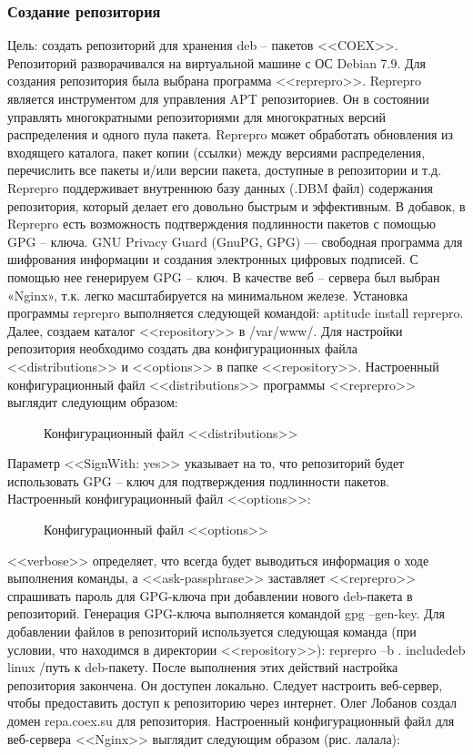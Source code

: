 \subsubsection{Создание репозитория}
Цель: создать репозиторий для хранения deb – пакетов <<COEX>>.
Репозиторий разворачивался на виртуальной машине с ОС Debian 7.9. Для создания репозитория была выбрана программа <<reprepro>>.
Reprepro является инструментом для управления APT репозиториев. Он в состоянии управлять многократными репозиториями для многократных версий распределения и одного пула пакета. Reprepro может обработать обновления из входящего каталога, пакет копии (ссылки) между версиями распределения, перечислить все пакеты и/или версии пакета, доступные в репозитории и т.д. 
Reprepro поддерживает внутреннюю базу данных (.DBM файл) содержания репозитория, который делает его довольно быстрым и эффективным.
В добавок, в Reprepro есть возможность подтверждения подлинности пакетов с помощью GPG – ключа.
GNU Privacy Guard (GnuPG, GPG) — свободная программа для шифрования информации и создания электронных цифровых подписей. С помощью нее генерируем GPG – ключ.
В качестве веб – сервера был выбран «Nginx», т.к. легко масштабируется на минимальном железе.
Установка программы reprepro выполняется следующей командой: aptitude install reprepro. Далее, создаем каталог <<repository>> в /var/www/. Для настройки репозитория необходимо создать два конфигурационных файла <<distributions>> и <<options>> в папке <<repository>>.
Настроенный конфигурационный файл <<distributions>> программы <<reprepro>> выглядит следующим образом:

\begin{figure}[h!]
\caption{ Конфигурационный файл <<distributions>> }
\label{kucher_4:kucher_4}
\end{figure}

Параметр <<SignWith: yes>> указывает на то, что репозиторий будет использовать GPG – ключ для подтверждения подлинности пакетов.
	Настроенный конфигурационный файл <<options>>:
	
\begin{figure}[h!]
\caption{ Конфигурационный файл <<options>> }
\label{kucher_5:kucher_5}
\end{figure}
	
	<<verbose>> определяет, что всегда будет выводиться информация о ходе выполнения команды, а <<ask-passphrase>> заставляет <<reprepro>> спрашивать пароль для GPG-ключа при добавлении нового deb-пакета в репозиторий.
Генерация GPG-ключа выполняется командой gpg --gen-key.
Для добавлении файлов в репозиторий используется следующая команда (при условии, что находимся в директории <<repository>>): reprepro –b . includedeb linux /путь к deb-пакету.
После выполнения этих действий настройка репозитория закончена. Он доступен локально. Следует настроить веб-сервер, чтобы предоставить доступ к репозиторию через интернет. Олег Лобанов создал домен repa.coex.su для репозитория. Настроенный конфигурационный файл для веб-сервера <<Nginx>> выглядит следующим образом (рис. лалала):
	
